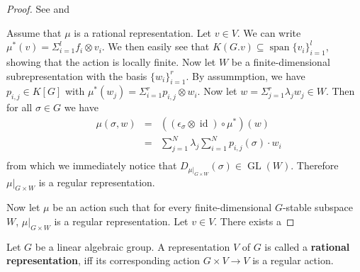 \begin{proof}
  See \cite[A.1.8]{DK15} and \cite[2.2.5(b)$\implies$(c),2.2.6]{DK15}

  Assume that $\mu$ is a rational representation.
  Let $v \in V$.
  We can write $\mu^\ast (v) = \Sigma_{i=1}^l f_i \otimes v_i$. %
  We then easily see that $K(G.v) \subseteq \operatorname{span}\{v_i\}_{i=1}^l$, showing that the action is locally finite.
  Now let $W$ be a finite-dimensional subrepresentation with the basis $\{w_i\}_{i=1}^r$.
  By assummption, we have $p_{i,j} \in K[G]$ with $ \mu^\ast (w_j) = \Sigma_{i=1}^r p_{i,j} \otimes w_i$.
  Now let $w = \Sigma_{j=1}^r \lambda_j w_j \in W$.
  Then for all $\sigma \in G$ we have
  \begin{equation}
    \begin{aligned}
      &\mu (\sigma,w)
      &=& \left(\left(\epsilon_\sigma \otimes \operatorname{id} \right) \circ \mu^\ast \right) \left(w \right) \\
      &&=& \sum_{j=1}^N \lambda_j  \sum_{i=1}^N p_{i,j}\left(\sigma\right) \cdot w_i \\
    \end{aligned}
  \end{equation}
  from which we immediately notice that $D_{\left. \mu \right|_{G \times W}} (\sigma) \in \operatorname{GL}(W)$.
  Therefore $\left. \mu \right|_{G\times W}$ is a regular representation.

  Now let $\mu$ be an action such that for every finite-dimensional $G$-stable subspace $W$, $\left. \mu \right|_{G\times W}$ is a regular representation.
  Let $v \in V$.
  There exists a 
\end{proof}

\begin{definition}
  Let $G$ be a linear algebraic group.
  A representation $V$ of $G$ is called a \textbf{rational representation}, iff its corresponding action $ G \times V \longrightarrow V $ is a regular action.
\end{definition}

